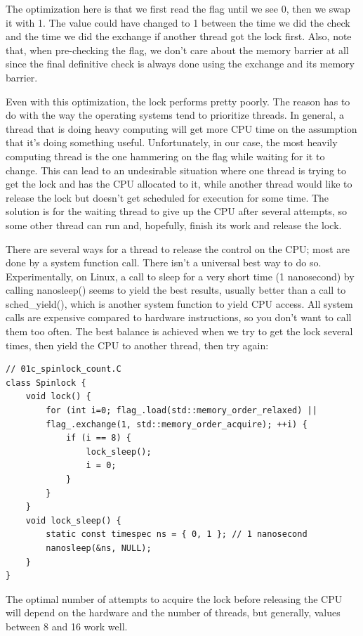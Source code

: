 The optimization here is that we first read the flag until we see 0, then we swap it with 1. The value could have changed to 1 between the time we did the check and the time we did the exchange if another thread got the lock first. Also, note that, when pre-checking the flag, we don't care about the memory barrier at all since the final definitive check is always done using the exchange and its memory barrier.

Even with this optimization, the lock performs pretty poorly. The reason has to do with the way the operating systems tend to prioritize threads. In general, a thread that is doing heavy computing will get more CPU time on the assumption that it's doing something useful. Unfortunately, in our case, the most heavily computing thread is the one hammering on the flag while waiting for it to change. This can lead to an undesirable situation where one thread is trying to get the lock and has the CPU allocated to it, while another thread would like to release the lock but doesn't get scheduled for execution for some time. The solution is for the waiting thread to give up the CPU after several attempts, so some other thread can run and, hopefully, finish its work and release the lock.

There are several ways for a thread to release the control on the CPU; most are done by a system function call. There isn't a universal best way to do so. Experimentally, on Linux, a call to sleep for a very short time (1 nanosecond) by calling nanosleep() seems to yield the best results, usually better than a call to sched\_yield(), which is another system function to yield CPU access. All system calls are expensive compared to hardware instructions, so you don't want to call them too often. The best balance is achieved when we try to get the lock several times, then yield the CPU to another thread, then try again:

\begin{lstlisting}[style=styleCXX]
// 01c_spinlock_count.C
class Spinlock {
	void lock() {
		for (int i=0; flag_.load(std::memory_order_relaxed) ||
		flag_.exchange(1, std::memory_order_acquire); ++i) {
			if (i == 8) {
				lock_sleep();
				i = 0;
			}
		}
	}
	void lock_sleep() {
		static const timespec ns = { 0, 1 }; // 1 nanosecond
		nanosleep(&ns, NULL);
	}
}
\end{lstlisting}

The optimal number of attempts to acquire the lock before releasing the CPU will depend on the hardware and the number of threads, but generally, values between 8 and 16 work well.

